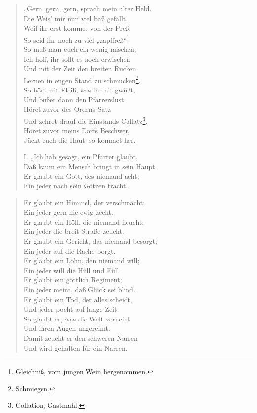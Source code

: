 \begin{quote}
„Gern, gern, gern, sprach mein alter Held.\\
Die Weis’ mir nun viel baß gefällt.\\
Weil ihr erst kommet von der Preß,\\
So seid ihr noch zu viel „zapffreß“\footnote{Gleichniß, vom jungen Wein hergenommen.}\\
So muß man euch ein wenig mischen;\\
Ich hoff, ihr sollt es noch erwischen\\
Und mit der Zeit den breiten Rucken\\
Lernen in engen Stand zu schmucken\footnote{Schmiegen.}.\\
So hört mit Fleiß, was ihr nit gwüßt,\\
Und büßet dann den Pfarrerslust.\\
Höret zuvor des Ordens Satz\\
Und zehret drauf die Einstands-Collatz\footnote{Collation, Gastmahl.}.\\
Höret zuvor meins Dorfs Beschwer,\\
Jückt euch die Haut, so kommet her.

I. „Ich hab gesagt, ein Pfarrer glaubt,\\
Daß kaum ein Mensch bringt in sein Haupt.\\
Er glaubt ein Gott, des niemand acht;\\
Ein jeder nach sein Götzen tracht.
\end{quote}

\begin{verse}
Er glaubt ein Himmel, der verschmächt;\\
Ein jeder gern hie ewig zecht.\\
Er glaubt ein Höll, die niemand fleucht;\\
Ein jeder die breit Straße zeucht.\\
Er glaubt ein Gericht, das niemand besorgt;\\
Ein jeder auf die Rache borgt.\\
Er glaubt ein Lohn, den niemand will;\\
Ein jeder will die Hüll und Füll.\\
Er glaubt ein göttlich Regiment;\\
Ein jeder meint, daß Glück sei blind.\\
Er glaubt ein Tod, der alles scheidt,\\
Und jeder pocht auf lange Zeit.\\
So glaubt er, was die Welt verneint\\
Und ihren Augen ungereimt.\\
Damit zeucht er den schweren Narren\\
Und wird gehalten für ein Narren.
\end{verse}

